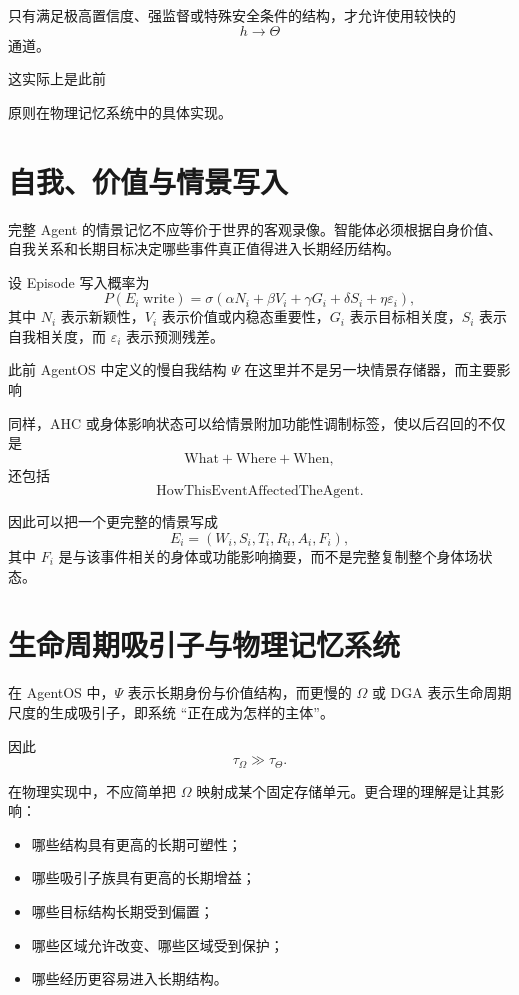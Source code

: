 只有满足极高置信度、强监督或特殊安全条件的结构，才允许使用较快的
\[
h\rightarrow\Theta
\]
通道。

这实际上是此前
\begin{statementbox}
\centering
{}
\end{statementbox}
原则在物理记忆系统中的具体实现。

\section{自我、价值与情景写入}

完整 Agent 的情景记忆不应等价于世界的客观录像。智能体必须根据自身价值、自我关系和长期目标决定哪些事件真正值得进入长期经历结构。

设 Episode 写入概率为
\[
P(E_i\;\mathrm{write})
=
\sigma
\left(
\alpha N_i
+
\beta V_i
+
\gamma G_i
+
\delta S_i
+
\eta\varepsilon_i
\right),
\]
其中 $N_i$ 表示新颖性，$V_i$ 表示价值或内稳态重要性，$G_i$ 表示目标相关度，$S_i$ 表示自我相关度，而 $\varepsilon_i$ 表示预测残差。

此前 AgentOS 中定义的慢自我结构 $\Psi$ 在这里并不是另一块情景存储器，而主要影响
\begin{statementbox}
\centering
{}
\end{statementbox}

同样，AHC 或身体影响状态可以给情景附加功能性调制标签，使以后召回的不仅是
\[
\mathrm{What}
+
\mathrm{Where}
+
\mathrm{When},
\]
还包括
\[
\mathrm{HowThisEventAffectedTheAgent}.
\]

因此可以把一个更完整的情景写成
\[
E_i
=
(
W_i,
S_i,
T_i,
R_i,
A_i,
F_i
),
\]
其中 $F_i$ 是与该事件相关的身体或功能影响摘要，而不是完整复制整个身体场状态。

\section{生命周期吸引子与物理记忆系统}

在 AgentOS 中，$\Psi$ 表示长期身份与价值结构，而更慢的 $\Omega$ 或 DGA 表示生命周期尺度的生成吸引子，即系统 ``正在成为怎样的主体''。

因此
\[
\tau_\Omega\gg\tau_\Theta.
\]

在物理实现中，不应简单把 $\Omega$ 映射成某个固定存储单元。更合理的理解是让其影响：

\begin{itemize}
    \item 哪些结构具有更高的长期可塑性；
    \item 哪些吸引子族具有更高的长期增益；
    \item 哪些目标结构长期受到偏置；
    \item 哪些区域允许改变、哪些区域受到保护；
    \item 哪些经历更容易进入长期结构。
\end{itemize}

